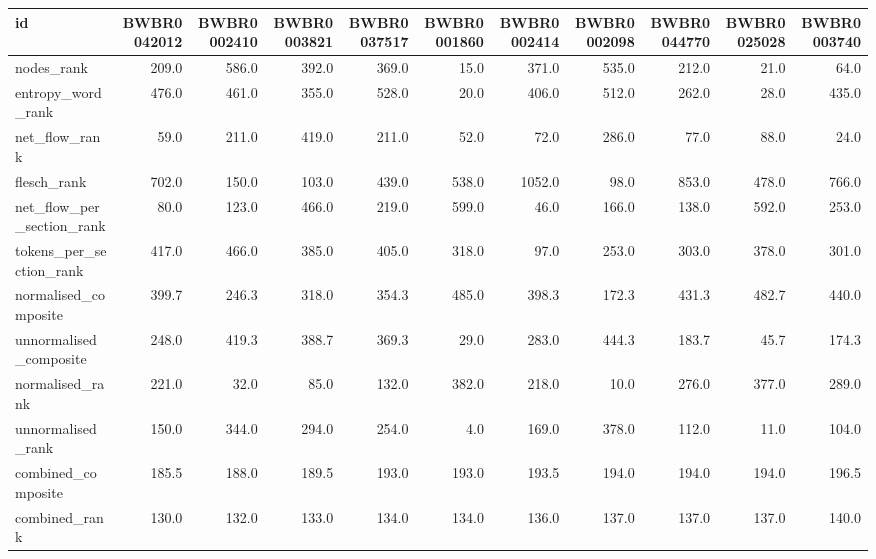 \begin{tabular}{lrrrrrrrrrr}
\toprule
id & BWBR0042012 & BWBR0002410 & BWBR0003821 & BWBR0037517 & BWBR0001860 & BWBR0002414 & BWBR0002098 & BWBR0044770 & BWBR0025028 & BWBR0003740 \\
\midrule
nodes\_rank & 209.0 & 586.0 & 392.0 & 369.0 & 15.0 & 371.0 & 535.0 & 212.0 & 21.0 & 64.0 \\
\cline{1-11}
entropy\_word\_rank & 476.0 & 461.0 & 355.0 & 528.0 & 20.0 & 406.0 & 512.0 & 262.0 & 28.0 & 435.0 \\
\cline{1-11}
net\_flow\_rank & 59.0 & 211.0 & 419.0 & 211.0 & 52.0 & 72.0 & 286.0 & 77.0 & 88.0 & 24.0 \\
\cline{1-11}
flesch\_rank & 702.0 & 150.0 & 103.0 & 439.0 & 538.0 & 1052.0 & 98.0 & 853.0 & 478.0 & 766.0 \\
\cline{1-11}
net\_flow\_per\_section\_rank & 80.0 & 123.0 & 466.0 & 219.0 & 599.0 & 46.0 & 166.0 & 138.0 & 592.0 & 253.0 \\
\cline{1-11}
tokens\_per\_section\_rank & 417.0 & 466.0 & 385.0 & 405.0 & 318.0 & 97.0 & 253.0 & 303.0 & 378.0 & 301.0 \\
\cline{1-11}
normalised\_composite & 399.7 & 246.3 & 318.0 & 354.3 & 485.0 & 398.3 & 172.3 & 431.3 & 482.7 & 440.0 \\
\cline{1-11}
unnormalised\_composite & 248.0 & 419.3 & 388.7 & 369.3 & 29.0 & 283.0 & 444.3 & 183.7 & 45.7 & 174.3 \\
\cline{1-11}
normalised\_rank & 221.0 & 32.0 & 85.0 & 132.0 & 382.0 & 218.0 & 10.0 & 276.0 & 377.0 & 289.0 \\
\cline{1-11}
unnormalised\_rank & 150.0 & 344.0 & 294.0 & 254.0 & 4.0 & 169.0 & 378.0 & 112.0 & 11.0 & 104.0 \\
\cline{1-11}
combined\_composite & 185.5 & 188.0 & 189.5 & 193.0 & 193.0 & 193.5 & 194.0 & 194.0 & 194.0 & 196.5 \\
\cline{1-11}
combined\_rank & 130.0 & 132.0 & 133.0 & 134.0 & 134.0 & 136.0 & 137.0 & 137.0 & 137.0 & 140.0 \\
\cline{1-11}
\bottomrule
\end{tabular}
